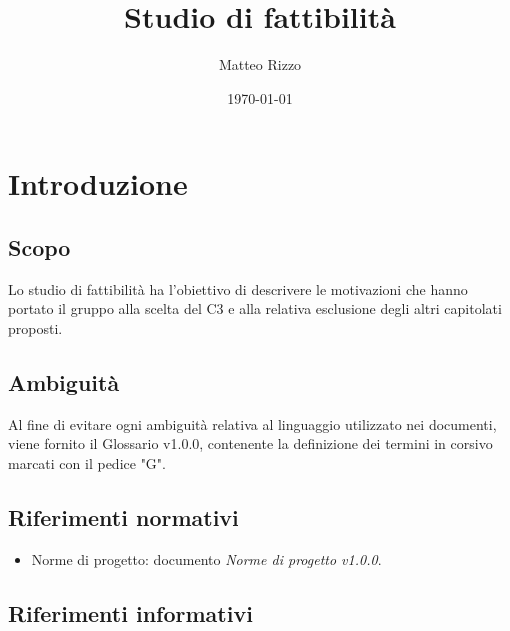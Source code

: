 \documentclass[openany,12pt,a4paper]{report}
\title{Studio di fattibilità}
\author{Matteo Rizzo}
\date{\today}
\begin{document}
\maketitle

 
\tableofcontents{}


\chapter{Introduzione}

\section{Scopo}

Lo studio di fattibilità ha l’obiettivo di descrivere le motivazioni che hanno portato
il gruppo alla scelta del   C3 e alla relativa esclusione degli altri capitolati proposti.

\section{Ambiguità}

Al fine di evitare ogni ambiguità relativa al linguaggio utilizzato nei documenti, viene
fornito il Glossario v1.0.0, contenente la definizione dei termini in corsivo marcati con
il pedice "G".

\section{Riferimenti normativi}

\begin{itemize}

    \item{Norme di progetto:} documento \textit{Norme di progetto v1.0.0}.

\end{itemize}

\section{Riferimenti informativi}
\end{document}
